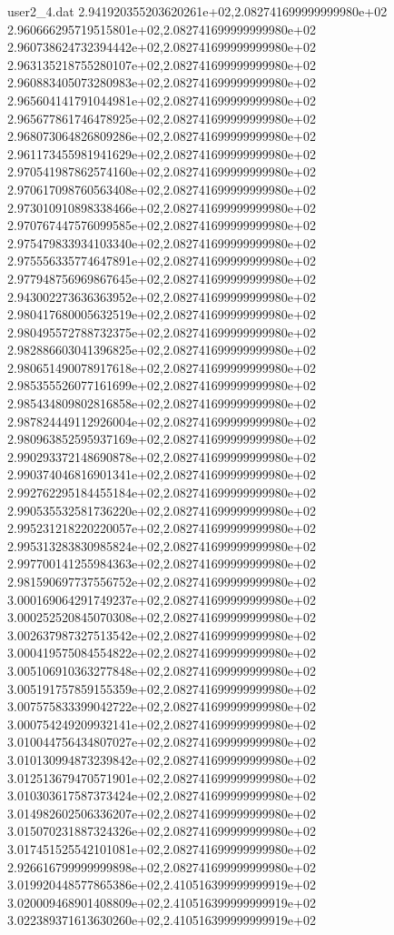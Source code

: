\begin{filecontents}{user2_4.dat}
2.941920355203620261e+02,2.082741699999999980e+02
2.960666295719515801e+02,2.082741699999999980e+02
2.960738624732394442e+02,2.082741699999999980e+02
2.963135218755280107e+02,2.082741699999999980e+02
2.960883405073280983e+02,2.082741699999999980e+02
2.965604141791044981e+02,2.082741699999999980e+02
2.965677861746478925e+02,2.082741699999999980e+02
2.968073064826809286e+02,2.082741699999999980e+02
2.961173455981941629e+02,2.082741699999999980e+02
2.970541987862574160e+02,2.082741699999999980e+02
2.970617098760563408e+02,2.082741699999999980e+02
2.973010910898338466e+02,2.082741699999999980e+02
2.970767447576099585e+02,2.082741699999999980e+02
2.975479833934103340e+02,2.082741699999999980e+02
2.975556335774647891e+02,2.082741699999999980e+02
2.977948756969867645e+02,2.082741699999999980e+02
2.943002273636363952e+02,2.082741699999999980e+02
2.980417680005632519e+02,2.082741699999999980e+02
2.980495572788732375e+02,2.082741699999999980e+02
2.982886603041396825e+02,2.082741699999999980e+02
2.980651490078917618e+02,2.082741699999999980e+02
2.985355526077161699e+02,2.082741699999999980e+02
2.985434809802816858e+02,2.082741699999999980e+02
2.987824449112926004e+02,2.082741699999999980e+02
2.980963852595937169e+02,2.082741699999999980e+02
2.990293372148690878e+02,2.082741699999999980e+02
2.990374046816901341e+02,2.082741699999999980e+02
2.992762295184455184e+02,2.082741699999999980e+02
2.990535532581736220e+02,2.082741699999999980e+02
2.995231218220220057e+02,2.082741699999999980e+02
2.995313283830985824e+02,2.082741699999999980e+02
2.997700141255984363e+02,2.082741699999999980e+02
2.981590697737556752e+02,2.082741699999999980e+02
3.000169064291749237e+02,2.082741699999999980e+02
3.000252520845070308e+02,2.082741699999999980e+02
3.002637987327513542e+02,2.082741699999999980e+02
3.000419575084554822e+02,2.082741699999999980e+02
3.005106910363277848e+02,2.082741699999999980e+02
3.005191757859155359e+02,2.082741699999999980e+02
3.007575833399042722e+02,2.082741699999999980e+02
3.000754249209932141e+02,2.082741699999999980e+02
3.010044756434807027e+02,2.082741699999999980e+02
3.010130994873239842e+02,2.082741699999999980e+02
3.012513679470571901e+02,2.082741699999999980e+02
3.010303617587373424e+02,2.082741699999999980e+02
3.014982602506336207e+02,2.082741699999999980e+02
3.015070231887324326e+02,2.082741699999999980e+02
3.017451525542101081e+02,2.082741699999999980e+02
2.926616799999999898e+02,2.082741699999999980e+02
3.019920448577865386e+02,2.410516399999999919e+02
3.020009468901408809e+02,2.410516399999999919e+02
3.022389371613630260e+02,2.410516399999999919e+02

\end{filecontents}
